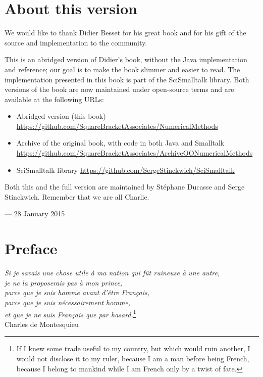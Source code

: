 \documentclass[twoside]{book}
\begin{document}
\fi


\chapter*{About this version}

We would like to thank Didier Besset for his great book and for his gift of the source and implementation to the community. 


This is an abridged version of Didier's book, without the Java implementation and reference; our goal is to make the book slimmer and easier to read.
The implementation presented in this book is part of the SciSmalltalk library.
Both versions of the book are now maintained under open-source terms and are available at the following URLs:

\begin{itemize}
\item Abridged version (this book)\\
  \url{https://github.com/SquareBracketAssociates/NumericalMethods}
\item Archive of the original book, with code in both Java and Smalltalk\\
  \url{https://github.com/SquareBracketAssociates/ArchiveOONumericalMethods}
\item SciSmalltalk library
  \url{https://github.com/SergeStinckwich/SciSmalltalk}
\end{itemize}

Both this and the full version are maintained by St\'ephane Ducasse and Serge Stinckwich.
Remember that we are all Charlie.

\bigskip\noindent
--- 28 January 2015



\chapter*{Preface}

\vspace{10 ex} \begin{flushright} {\sl Si je savais une chose
utile \`{a} ma nation qui f\^{u}t ruineuse \`{a} une autre,\\je ne
la proposerais pas \`{a} mon prince,\\parce que je suis homme
avant d'\^etre Fran\c cais,\\parce que je suis n\'ecessairement
homme,\\et que je ne suis Fran\c cais que par hasard.}\footnote{If I
knew some trade useful to my country, but which would ruin
another, I would not disclose it to my ruler, because I am a man
before being French, because I belong to mankind while I am French
only by a twist of fate.}\\ Charles de Montesquieu
\end{flushright}
\end{document}
